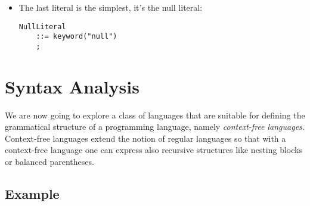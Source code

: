 \documentclass[a4paper,oneside,11pt]{book}
\theoremstyle{definition}
\begin{document}
\begin{itemize}
\begin{enumerate}
\item
Wide strings like w"abc", or wide strings containing escapes. The type of wide string literal is \textbf{const wchar*}.

\item
Unicode strings like u"abc", or Unicode strings containing escapes. The type of Unicode string literal is \textbf{const uchar*}.

\item
Raw strings, that have @-prefix and have no escapes in them, like @"abc$\backslash$". The contents of raw string is taken literally.
The type of raw string literal is \textbf{const char*}.
\end{enumerate}

\begin{flushleft}
\begin{lstlisting}[language=cmpg,frame=trBL]
StringLiteral
    ::= string
    |   'w'string
    |   'u'string
    |   raw_string
    ;

string
    ::= token('"' (([^"\\\r\n]+) | escape)* '"')
    ;

raw_string
    ::= '@' token('"' [^"]* '"')
    ;
\end{lstlisting}
\end{flushleft}

\item
The last literal is the simplest, it's the null literal:

\begin{flushleft}
\begin{lstlisting}[language=cmpg,frame=trBL]
NullLiteral
    ::= keyword("null")
    ;
\end{lstlisting}
\end{flushleft}

\end{itemize}

\chapter{Syntax Analysis}

We are now going to explore a class of languages that are suitable for defining the grammatical structure of a programming language,
namely \emph{context-free languages}.
Context-free languages extend the notion of regular languages so that with a context-free language one can express also recursive
structures like nesting blocks or balanced parentheses.

\section{Example}
\end{document}
